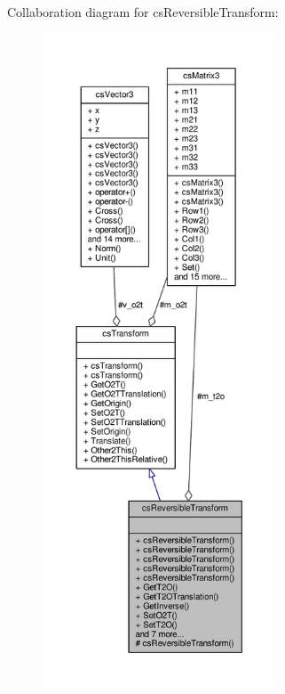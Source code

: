 Collaboration diagram for cs\+Reversible\+Transform\+:
\nopagebreak
\begin{figure}[H]
\begin{center}
\leavevmode
\includegraphics[height=550pt]{d0/d6e/classcsReversibleTransform__coll__graph}
\end{center}
\end{figure}
